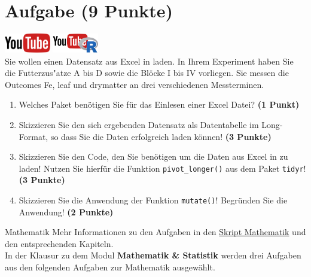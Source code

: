 \documentclass[a4paper, 10pt]{scrartcl}\usepackage[]{graphicx}\usepackage[]{xcolor}
\begin{document}
 
\clearpage

\section{Aufgabe \hfill (9 Punkte)}

\hfill\href{https://youtu.be/Oxa97uqNyCQ}{\includegraphics[width =
  2cm]{img/youtube}}
\hspace{2Ex}
\href{https://youtu.be/ymFfBkWyb8s}{\includegraphics[width =
  2cm]{img/youtube_R}}\\[1Ex]




Sie wollen einen Datensatz aus Excel in \Rlogo laden. In Ihrem Experiment haben Sie
die Futterzus{"a}tze A bis D sowie die Bl{\"o}cke I bis IV
vorliegen. Sie messen die Outcomes Fe, leaf und drymatter an drei verschiedenen Messterminen.

\begin{enumerate}
\item Welches \Rlogo Paket ben{\"o}tigen Sie f{\"u}r das Einlesen einer Excel Datei?
  \textbf{(1 Punkt)} 
\item Skizzieren Sie den sich ergebenden Datensatz als Datentabelle im
  Long-Format, so dass Sie die Daten erfolgreich \Rlogo laden k{\"o}nnen!
  \textbf{(3 Punkte)}
\item Skizzieren Sie den \Rlogo Code, den Sie ben{\"o}tigen um die Daten aus
  Excel in \Rlogo zu laden! Nutzen Sie hierf{\"u}r die Funktion
  \texttt{pivot\_longer()} aus dem \Rlogo Paket \texttt{tidyr}! \textbf{(3
    Punkte)}
\item Skizzieren Sie die Anwendung der Funktion \texttt{mutate()}!
  Begr{\"u}nden Sie die Anwendung! \textbf{(2 Punkte)}
\end{enumerate}


 
\clearpage
\begin{graybox}{Mathematik}
Mehr Informationen zu den Aufgaben in den \href{https://jkruppa.github.io/math/}{Skript Mathematik} und den entsprechenden Kapiteln.\\

In der Klausur zu dem Modul \textbf{Mathematik \& Statistik} werden drei Aufgaben aus den folgenden Aufgaben zur Mathematik ausgewählt. \\
\end{graybox}
\clearpage
\end{document}
